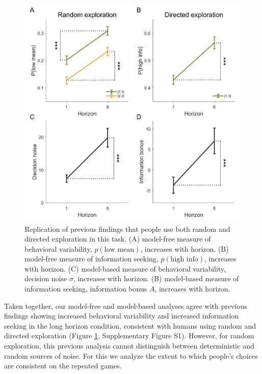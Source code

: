 \documentclass[12pt]{article}
\begin{document}
{	\begin{figure}[H]
		\begin{center}
			\includegraphics[width=\textwidth]{figures/RanDetNoise_modelfree.jpg}
			\caption{Replication of previous findings that people use both random and directed exploration in this task. (A) model-free measure of behavioral variability, $p(\mbox{low mean})$, increases with horizon. (B) model-free measure of information seeking, $p(\mbox{high info})$, increases with horizon. (C) model-based measure of behavioral variability, decision noise $\sigma$, increases with horizon. (B) model-based measure of information seeking, information bonus $A$, increases with horizon.}
			\label{fig:modelfree}
		\end{center}
	\end{figure}
	
	Taken together, our model-free and model-based analyses agree with previous findings showing increased behavioral variability and increased information seeking in the long horizon condition, consistent with humans using random and directed exploration (Figure \ref{fig:modelfree}, Supplementary Figure S1). However, for random exploration, this previous analysis cannot distinguish between deterministic and random sources of noise. For this we analyze the extent to which people's choices are consistent on the repeated games.
	
}
\end{document}
